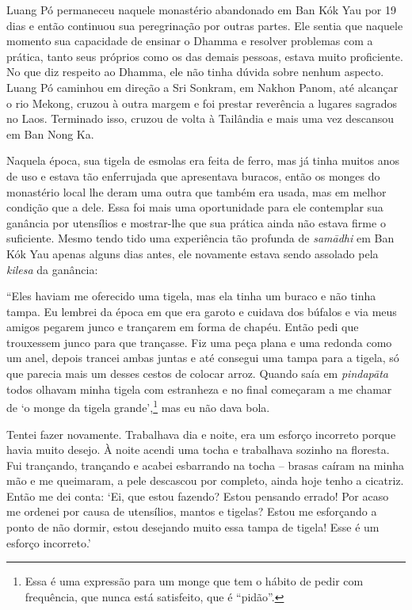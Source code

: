 Luang Pó permaneceu naquele monastério abandonado em Ban Kók Yau por 19
dias e então continuou sua peregrinação por outras partes. Ele sentia
que naquele momento sua capacidade de ensinar o Dhamma e resolver
problemas com a prática, tanto seus próprios como os das demais pessoas,
estava muito proficiente. No que diz respeito ao Dhamma, ele não tinha
dúvida sobre nenhum aspecto. Luang Pó caminhou em direção a Sri Sonkram,
em Nakhon Panom, até alcançar o rio Mekong, cruzou à outra margem e foi
prestar reverência a lugares sagrados no Laos. Terminado isso, cruzou de
volta à Tailândia e mais uma vez descansou em Ban Nong Ka.

Naquela época, sua tigela de esmolas era feita de ferro, mas já tinha
muitos anos de uso e estava tão enferrujada que apresentava buracos,
então os monges do monastério local lhe deram uma outra que também era
usada, mas em melhor condição que a dele. Essa foi mais uma oportunidade
para ele contemplar sua ganância por utensílios e mostrar-lhe que sua
prática ainda não estava firme o suficiente. Mesmo tendo tido uma
experiência tão profunda de \emph{samādhi} em Ban Kók Yau apenas alguns
dias antes, ele novamente estava sendo assolado pela \emph{kilesa} da
ganância:

``Eles haviam me oferecido uma tigela, mas ela tinha um buraco e não
tinha tampa. Eu lembrei da época em que era garoto e cuidava dos búfalos
e via meus amigos pegarem junco e trançarem em forma de chapéu. Então
pedi que trouxessem junco para que trançasse. Fiz uma peça plana e uma
redonda como um anel, depois trancei ambas juntas e até consegui uma
tampa para a tigela, só que parecia mais um desses cestos de colocar
arroz. Quando saía em \emph{pindapāta} todos olhavam minha tigela com
estranheza e no final começaram a me chamar de `o monge da tigela
grande',\footnote{Essa é uma expressão para um monge que tem o hábito de
  pedir com frequência, que nunca está satisfeito, que é ``pidão''.}
mas eu não dava bola.

Tentei fazer novamente. Trabalhava dia e noite, era um esforço incorreto
porque havia muito desejo. À noite acendi uma tocha e trabalhava sozinho
na floresta. Fui trançando, trançando e acabei esbarrando na tocha --
brasas caíram na minha mão e me queimaram, a pele descascou por
completo, ainda hoje tenho a cicatriz. Então me dei conta: `Ei, que
estou fazendo? Estou pensando errado! Por acaso me ordenei por causa de
utensílios, mantos e tigelas? Estou me esforçando a ponto de não dormir,
estou desejando muito essa tampa de tigela! Esse é um esforço
incorreto.'

